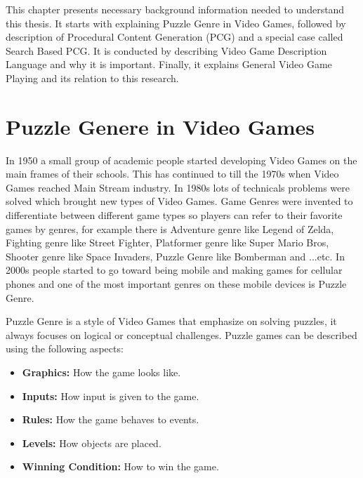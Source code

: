 This chapter presents necessary background information needed to understand this thesis. It starts with explaining Puzzle Genre in Video Games, followed by description of Procedural Content Generation (PCG) and a special case called Search Based PCG. It is conducted by describing Video Game Description Language and why it is important. Finally, it explains General Video Game Playing and its relation to this research.

\section{Puzzle Genere in Video Games}
In 1950 a small group of academic people started developing Video Games on the main frames of their schools. This has continued to till the 1970s when Video Games reached Main Stream industry. In 1980s lots of technicals problems were solved which brought new types of Video Games. Game Genres were invented to differentiate between different game types so players can refer to their favorite games by genres, for example there is Adventure genre like Legend of Zelda, Fighting genre like Street Fighter, Platformer genre like Super Mario Bros, Shooter genre like Space Invaders, Puzzle Genre like Bomberman and ...etc. In 2000s people started to go toward being mobile and making games for cellular  phones and one of the most important genres on these mobile devices is Puzzle Genre\cite{pcgHistory}.\\\par

Puzzle Genre is a style of Video Games that emphasize on solving puzzles, it always focuses on logical or conceptual challenges. Puzzle games can be described using the following aspects:
\begin{itemize} \itemsep0pt \parskip0pt 
	\item \textbf{Graphics:} How the game looks like.
  	\item \textbf{Inputs:} How input is given to the game.
  	\item \textbf{Rules:} How the game behaves to events.
  	\item \textbf{Levels:} How objects are placed.
  	\item \textbf{Winning Condition:} How to win the game.
\end{itemize}

